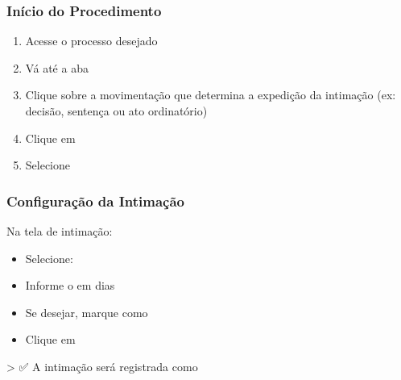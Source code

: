 \documentclass[letterpaper,10pt,brazil]{sphinxmanual}
\begin{document}
\subsubsection{Início do Procedimento}
\label{\detokenize{projud_29_intimacaoARdigital:inicio-do-procedimento}}\begin{enumerate}
%
\item {} 
\sphinxAtStartPar
Acesse o processo desejado

\item {} 
\sphinxAtStartPar
Vá até a aba 

\item {} 
\sphinxAtStartPar
Clique sobre a movimentação que determina a expedição da intimação (ex: decisão, sentença ou ato ordinatório)

\item {} 
\sphinxAtStartPar
Clique em 

\item {} 
\sphinxAtStartPar
Selecione 

\end{enumerate}


\subsubsection{Configuração da Intimação}
\label{\detokenize{projud_29_intimacaoARdigital:configuracao-da-intimacao}}
\sphinxAtStartPar
Na tela de intimação:
\begin{itemize}
\item {} 
\sphinxAtStartPar
Selecione: 

\item {} 
\sphinxAtStartPar
Informe o  em dias

\item {} 
\sphinxAtStartPar
Se desejar, marque como 

\item {} 
\sphinxAtStartPar
Clique em 

\end{itemize}

\sphinxAtStartPar
\textgreater{} ✅ A intimação será registrada como 
\end{document}
